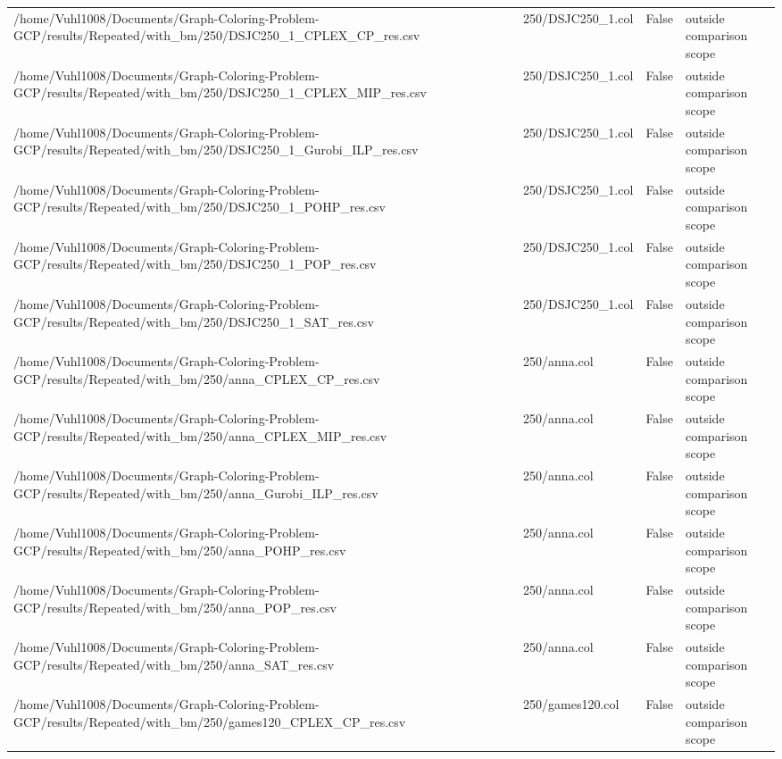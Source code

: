\begin{table}[htbp]
\begin{tabular}{llll}
/home/Vuhl1008/Documents/Graph-Coloring-Problem-GCP/results/Repeated/with\_bm/250/DSJC250\_1\_CPLEX\_CP\_res.csv & 250/DSJC250\_1.col & False & outside comparison scope \\
/home/Vuhl1008/Documents/Graph-Coloring-Problem-GCP/results/Repeated/with\_bm/250/DSJC250\_1\_CPLEX\_MIP\_res.csv & 250/DSJC250\_1.col & False & outside comparison scope \\
/home/Vuhl1008/Documents/Graph-Coloring-Problem-GCP/results/Repeated/with\_bm/250/DSJC250\_1\_Gurobi\_ILP\_res.csv & 250/DSJC250\_1.col & False & outside comparison scope \\
/home/Vuhl1008/Documents/Graph-Coloring-Problem-GCP/results/Repeated/with\_bm/250/DSJC250\_1\_POHP\_res.csv & 250/DSJC250\_1.col & False & outside comparison scope \\
/home/Vuhl1008/Documents/Graph-Coloring-Problem-GCP/results/Repeated/with\_bm/250/DSJC250\_1\_POP\_res.csv & 250/DSJC250\_1.col & False & outside comparison scope \\
/home/Vuhl1008/Documents/Graph-Coloring-Problem-GCP/results/Repeated/with\_bm/250/DSJC250\_1\_SAT\_res.csv & 250/DSJC250\_1.col & False & outside comparison scope \\
/home/Vuhl1008/Documents/Graph-Coloring-Problem-GCP/results/Repeated/with\_bm/250/anna\_CPLEX\_CP\_res.csv & 250/anna.col & False & outside comparison scope \\
/home/Vuhl1008/Documents/Graph-Coloring-Problem-GCP/results/Repeated/with\_bm/250/anna\_CPLEX\_MIP\_res.csv & 250/anna.col & False & outside comparison scope \\
/home/Vuhl1008/Documents/Graph-Coloring-Problem-GCP/results/Repeated/with\_bm/250/anna\_Gurobi\_ILP\_res.csv & 250/anna.col & False & outside comparison scope \\
/home/Vuhl1008/Documents/Graph-Coloring-Problem-GCP/results/Repeated/with\_bm/250/anna\_POHP\_res.csv & 250/anna.col & False & outside comparison scope \\
/home/Vuhl1008/Documents/Graph-Coloring-Problem-GCP/results/Repeated/with\_bm/250/anna\_POP\_res.csv & 250/anna.col & False & outside comparison scope \\
/home/Vuhl1008/Documents/Graph-Coloring-Problem-GCP/results/Repeated/with\_bm/250/anna\_SAT\_res.csv & 250/anna.col & False & outside comparison scope \\
/home/Vuhl1008/Documents/Graph-Coloring-Problem-GCP/results/Repeated/with\_bm/250/games120\_CPLEX\_CP\_res.csv & 250/games120.col & False & outside comparison scope \\

\end{tabular}
\end{table}
